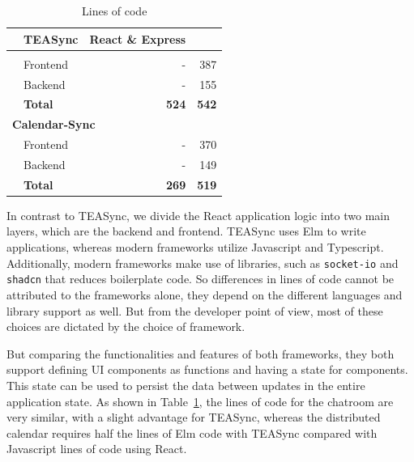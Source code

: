 \begin{table}[]
\begin{tabular}{llrr}
\rowcolor[HTML]{C0C0C0} 
\multicolumn{2}{l|}{\cellcolor[HTML]{C0C0C0}\textbf{Applications}} & \multicolumn{1}{l|}{\cellcolor[HTML]{C0C0C0}\textbf{TEASync}} & \textbf{React \& Express} \\ \hline
\rowcolor[HTML]{EFEFEF} 
\multicolumn{4}{l}{\cellcolor[HTML]{EFEFEF}\textbf{Chatroom}} \\ \hline
          & Frontend                &     -      &    387   \\ \cline{2-4} 
          & Backend                 &     -      &    155   \\ \cline{2-4} 
          & \textbf{Total}          &      \textbf{524}     &    \textbf{542}   \\ \cline{2-4} 
\multicolumn{4}{l}{\cellcolor[HTML]{EFEFEF}\textbf{Calendar-Sync}} \\ \hline
          & Frontend                &     -      &    370   \\ \cline{2-4} 
          & Backend                 &     -      &    149   \\ \cline{2-4} 
          & \textbf{Total}          &    \textbf{269}       &    \textbf{519}   \\ \cline{2-4} 

\end{tabular}
\caption{Lines of code}\label{tbl:lines_of_code}
\end{table}


In contrast to TEASync, we divide the React application logic into two main layers, which are the backend and frontend. TEASync uses Elm to write applications, whereas modern frameworks utilize Javascript and Typescript. Additionally, modern frameworks make use of libraries, such as \lstinline{socket-io}\cite{socketio} and \lstinline{shadcn}\cite{shadcn} that reduces boilerplate code.  So differences in lines of code cannot be attributed to the frameworks alone, they depend on the different languages and library support as well.  But from the developer point of view, most of these choices are dictated by the choice of framework.  

But comparing the functionalities and features of both frameworks, they both support defining UI components as functions and having a state for components. This state can be used to persist the data between updates in the entire application state.
As shown in Table~\ref{tbl:lines_of_code},
the lines of code for the chatroom are very similar, with a slight advantage for TEASync,
whereas the distributed calendar requires half the lines of Elm code with TEASync 
compared with Javascript lines of code using React.

